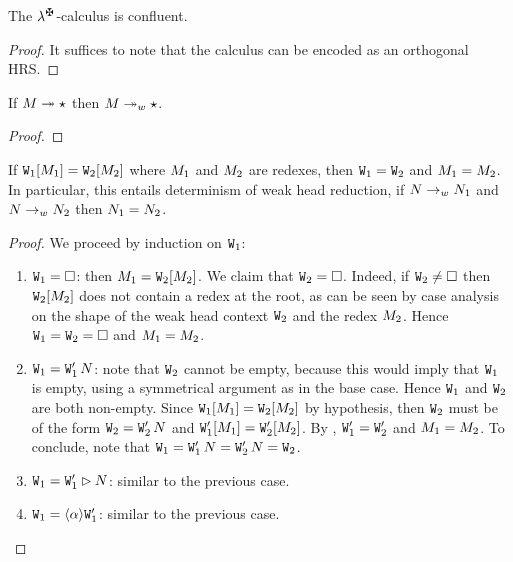 
\begin{proposition}[Confluence]
\label{prop:confluence}
The $\lambdaCheck$-calculus is confluent.
\end{proposition}
\begin{proof}
It suffices to note that the calculus can be encoded as an orthogonal HRS.
\end{proof}

\begin{proposition}
\label{prop:factorization}
If $M \twoheadrightarrow \star$ then $M \twoheadrightarrow_{w} \star$.
\end{proposition}
\begin{proof}
\end{proof}

\begin{lemma}
\label{lem:uniqueness_of_weak_head_redex}
If $\mathtt{W}_1[M_1] = \mathtt{W}_2[M_2]$
where $M_1$ and $M_2$ are redexes, then
$\mathtt{W}_1 = \mathtt{W}_2$ and $M_1 = M_2$.
In particular, this entails determinism of weak head reduction,
\ie if $N \to_{w} N_1$ and $N \to_{w} N_2$
then $N_1 = N_2$.
\end{lemma}
\begin{proof}
We proceed by induction on $\mathtt{W}_1$:
\begin{enumerate}
\item
  $\mathtt{W}_1 = \Box$: then $M_1 = \mathtt{W}_2[M_2]$.
  We claim that $\mathtt{W}_2 = \Box$.
  Indeed, if $\mathtt{W}_2 \neq \Box$
  then $\mathtt{W}_2[M_2]$ does not contain a redex at the root,
  as can be seen by case analysis on the shape of the weak head
  context $\mathtt{W}_2$ and the redex $M_2$.
  Hence $\mathtt{W}_1 = \mathtt{W}_2 = \Box$ and $M_1 = M_2$.
\item
  $\mathtt{W}_1 = \mathtt{W}'_1\,N$: note that $\mathtt{W}_2$ cannot be empty,
  because this would imply that $\mathtt{W}_1$ is empty,
  using a symmetrical argument as in the base case.
  Hence $\mathtt{W}_1$ and $\mathtt{W}_2$ are both non-empty.
  Since $\mathtt{W}_1[M_1] = \mathtt{W}_2[M_2]$ by hypothesis,
  then $\mathtt{W}_2$ must be of the form $\mathtt{W}_2 = \mathtt{W}'_2\,N$
  and $\mathtt{W}'_1[M_1] = \mathtt{W}'_2[M_2]$.
  By \ih, $\mathtt{W}'_1 = \mathtt{W}'_2$ and $M_1 = M_2$.
  To conclude, note that
  $\mathtt{W}_1 = \mathtt{W}'_1\,N = \mathtt{W}'_2\,N = \mathtt{W}_2$.
\item
  $\mathtt{W}_1 = \mathtt{W}'_1\rhd N$:
  similar to the previous case.
\item
  $\mathtt{W}_1 = \langle\alpha\rangle\mathtt{W}'_1$:
  similar to the previous case.
\end{enumerate}
\end{proof}


